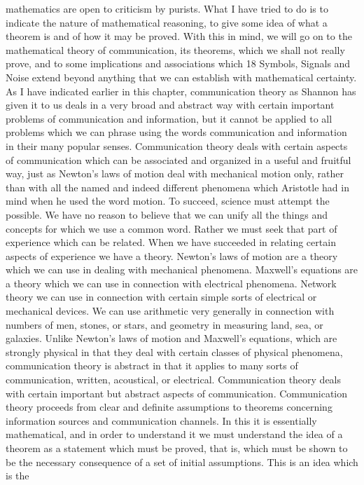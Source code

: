 mathematics are open to criticism by purists.
What I have tried to do is to indicate the nature of mathematical
reasoning, to give some idea of what a theorem is and of how it
may be proved. With this in mind, we will go on to the mathematical
theory of communication, its theorems, which we shall not
really prove, and to some implications and associations which
18 Symbols, Signals and Noise
extend beyond anything that we can establish with mathematical
certainty.
As I have indicated earlier in this chapter, communication
theory as Shannon has given it to us deals in a very broad and
abstract way with certain important problems of communication
and information, but it cannot be applied to all problems which
we can phrase using the words communication and information
in their many popular senses. Communication theory deals with
certain aspects of communication which can be associated and
organized in a useful and fruitful way, just as Newton’s laws of
motion deal with mechanical motion only, rather than with all the
named and indeed different phenomena which Aristotle had in
mind when he used the word motion.
To succeed, science must attempt the possible. We have no
reason to believe that we can unify all the things and concepts for
which we use a common word. Rather we must seek that part of
experience which can be related. When we have succeeded in
relating certain aspects of experience we have a theory. Newton’s
laws of motion are a theory which we can use in dealing with
mechanical phenomena. Maxwell’s equations are a theory which
we can use in connection with electrical phenomena. Network
theory we can use in connection with certain simple sorts of electrical
or mechanical devices. We can use arithmetic very generally
in connection with numbers of men, stones, or stars, and geometry
in measuring land, sea, or galaxies.
Unlike Newton’s laws of motion and Maxwell’s equations, which
are strongly physical in that they deal with certain classes of
physical phenomena, communication theory is abstract in that it
applies to many sorts of communication, written, acoustical, or
electrical. Communication theory deals with certain important but
abstract aspects of communication. Communication theory proceeds
from clear and definite assumptions to theorems concerning
information sources and communication channels. In this it is
essentially mathematical, and in order to understand it we must
understand the idea of a theorem as a statement which must be
proved, that is, which must be shown to be the necessary consequence
of a set of initial assumptions. This is an idea which is the
